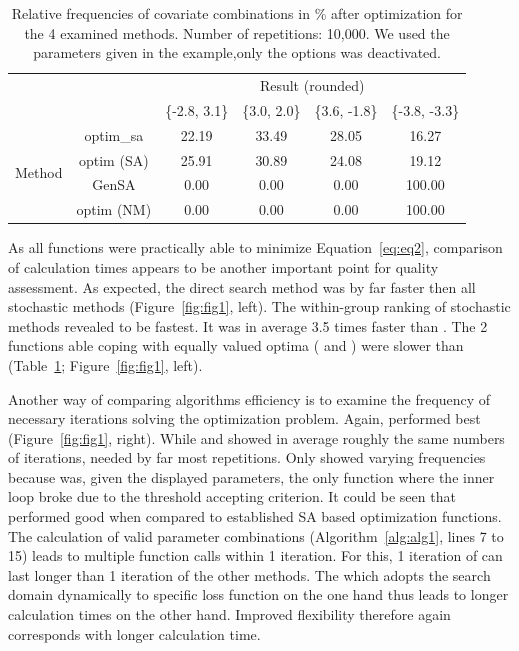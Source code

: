 \begin{table}[]
\centering
\caption{Relative frequencies of covariate combinations in \% after optimization for the 4 examined methods. Number of repetitions: 10,000. We used the parameters given in the example,only the  options was deactivated.}
\label{tab:tab1}
\begin{tabular}{cccccc} \cline{3-6}
& \multicolumn{1}{c}{} & \multicolumn{4}{c}{Result (rounded)}                    \\ \cline{3-6} 
&                      & \{-2.8, 3.1\} & \{3.0, 2.0\} & \{3.6, -1.8\} & \{-3.8, -3.3\} \\ \cline{2-6} 
\multirow{4}{*}{Method} & optim\_sa          & 22.19     & 33.49    & 28.05     & 16.27      \\
& optim (SA)            & 25.91     & 30.89    & 24.08     & 19.12      \\
& GenSA              & 0.00      & 0.00     & 0.00      & 100.00     \\
& optim (NM)          & 0.00      & 0.00     & 0.00      & 100.00     \\ \cline{2-6} 
\end{tabular}
\end{table}

As all functions were practically able to minimize Equation~\eqref{eq:eq2}, comparison of calculation times appears to be another important point for quality assessment. As expected, the direct search method  was by far faster then all stochastic methods (Figure~\ref{fig:fig1}, left). The within-group ranking of stochastic methods revealed  to be fastest. It was in average 3.5 times faster than . The 2 functions able coping with equally valued optima ( and ) were slower than  (Table~\ref{tab:tab1}; Figure~\ref{fig:fig1}, left).

Another way of comparing algorithms efficiency is to examine the frequency of necessary iterations solving the optimization problem. Again,  performed best (Figure~\ref{fig:fig1}, right). While  and  showed in average roughly the same numbers of iterations,  needed by far most repetitions. Only  showed varying frequencies because  was, given the displayed parameters, the only function where the inner loop broke due to the threshold accepting criterion. It could be seen that  performed good when compared to established SA based optimization functions. The calculation of valid parameter combinations (Algorithm~\ref{alg:alg1}, lines 7 to 15) leads to multiple function calls within 1 iteration. For this, 1 iteration of  can last longer than 1 iteration of the other methods. The  which adopts the search domain dynamically to specific loss function on the one hand thus leads to longer calculation times on the other hand. Improved flexibility therefore again corresponds with longer calculation time.

